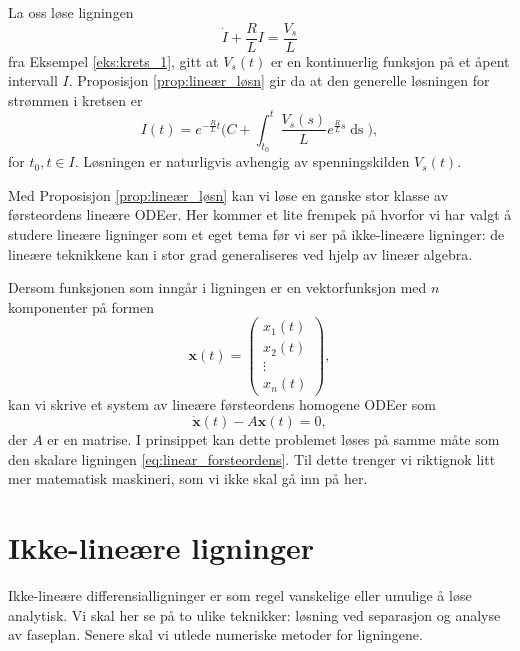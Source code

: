 \documentclass{article}
\theoremstyle{plain}
\theoremstyle{definition}
\theoremstyle{remark}
\newenvironment{ex}
{\pushQED{\qed}\renewcommand{\qedsymbol}{$\triangle$}\exx}
{\popQED\endexx}
\newcommand{\diff}[1]{\mathop{d#1}}
\newcommand{\fcn}{x}
\newcommand{\expfcn}[1]{e^{#1}}
\newcommand{\biggparanth}[1]{\bigg(#1\bigg)}
\begin{document}
\begin{ex} \label{eks:krets_2}
    La oss løse ligningen
    \begin{equation*}
        \dot{I} + \frac{R}{L} I = \frac{V_s}{L}
    \end{equation*}
    fra Eksempel \ref{eks:krets_1}, gitt at $V_s(t)$ er en kontinuerlig funksjon på et åpent intervall $I$. Proposisjon \ref{prop:lineær_løsn} gir da at den generelle løsningen for strømmen i kretsen er
    \begin{equation*}
        I(t) = \expfcn{-\frac{R}{L}t}\biggparanth{C + \int_{t_0}^t \frac{V_s(s)}{L} \expfcn{\frac{R}{L}s} \diff{s} }, 
    \end{equation*}
    for $t_0, t \in I$. Løsningen er naturligvis avhengig av spenningskilden $V_s(t)$.
\end{ex}

Med Proposisjon \ref{prop:lineær_løsn} kan vi løse en ganske stor klasse av førsteordens lineære ODEer. Her kommer et lite frempek på hvorfor vi har valgt å studere lineære ligninger som et eget tema før vi ser på ikke-lineære ligninger: de lineære teknikkene kan i stor grad generaliseres ved hjelp av lineær algebra.

Dersom funksjonen som inngår i ligningen er en vektorfunksjon med $n$ komponenter på formen
\begin{equation*}
    \boldsymbol{\fcn}(t) =
    \begin{pmatrix}
        x_1(t) \\
        x_2(t) \\
        \vdots \\
        x_n(t)
    \end{pmatrix},
\end{equation*}
kan vi skrive et system av lineære førsteordens homogene ODEer som
\begin{equation*}
    \dot{\boldsymbol{\fcn}}(t) - A \boldsymbol{\fcn}(t) = 0,
\end{equation*}
der $A$ er en matrise. I prinsippet kan dette problemet løses på samme måte som den skalare ligningen \eqref{eq:linear_forsteordens}. Til dette trenger vi riktignok litt mer matematisk maskineri, som vi ikke skal gå inn på her.


\section*{Ikke-lineære ligninger}

Ikke-lineære differensialligninger er som regel vanskelige eller umulige å løse analytisk. Vi skal her se på to ulike teknikker: løsning ved separasjon og analyse av faseplan. Senere skal vi utlede numeriske metoder for ligningene.
\end{document}
